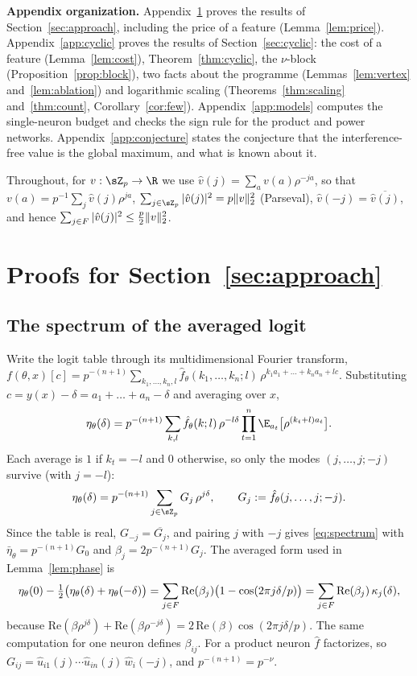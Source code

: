 \textbf{Appendix organization.} Appendix~\ref{app:approach} proves the results of Section~\ref{sec:approach}, including the price of a feature (Lemma~\ref{lem:price}). Appendix~\ref{app:cyclic} proves the results of Section~\ref{sec:cyclic}: the cost of a feature (Lemma~\ref{lem:cost}), Theorem~\ref{thm:cyclic}, the $\nu$-block (Proposition~\ref{prop:block}), two facts about the programme (Lemmas~\ref{lem:vertex} and~\ref{lem:ablation}) and logarithmic scaling (Theorems~\ref{thm:scaling} and~\ref{thm:count}, Corollary~\ref{cor:few}). Appendix~\ref{app:models} computes the single-neuron budget and checks the sign rule for the product and power networks. Appendix~\ref{app:conjecture} states the conjecture that the interference-free value is the global maximum, and what is known about it.

Throughout, for $v:\sZ_p\to\R$ we use $\hat v(j)=\sum_av(a)\rho^{-ja}$, so that $v(a)=p^{-1}\sum_j\hat v(j)\rho^{ja}$, $\sum_{j\in\sZ_p}|\hat v(j)|^2=p\|v\|_2^2$ (Parseval), $\hat v(-j)=\overline{\hat v(j)}$, and hence $\sum_{j\in F}|\hat v(j)|^2\le\frac p2\|v\|_2^2$.

\section{Proofs for Section~\ref{sec:approach}}\label{app:approach}

\subsection{The spectrum of the averaged logit}\label{app:spectrum}

Write the logit table through its multidimensional Fourier transform,
$f(\theta,x)[c]=p^{-(n+1)}\sum_{k_1,\dots,k_n,l}\hat f_\theta(k_1,\dots,k_n;l)\,\rho^{k_1a_1+\dots+k_na_n+lc}$. Substituting $c=y(x)-\delta=a_1+\dots+a_n-\delta$ and averaging over $x$,
\[
\eta_\theta(\delta)=p^{-(n+1)}\sum_{k,l}\hat f_\theta(k;l)\,\rho^{-l\delta}\prod_{t=1}^n\E_{a_t}\big[\rho^{(k_t+l)a_t}\big].
\]
Each average is $1$ if $k_t=-l$ and $0$ otherwise, so only the modes $(j,\dots,j;-j)$ survive (with $j=-l$):
\[
\eta_\theta(\delta)=p^{-(n+1)}\sum_{j\in\sZ_p}G_j\,\rho^{j\delta},\qquad G_j:=\hat f_\theta(j,\dots,j;-j).
\]
Since the table is real, $G_{-j}=\overline{G_j}$, and pairing $j$ with $-j$ gives \eqref{eq:spectrum} with $\bar\eta_\theta=p^{-(n+1)}G_0$ and $\beta_j=2p^{-(n+1)}G_j$. The averaged form used in Lemma~\ref{lem:phase} is
\[
\eta_\theta(0)-\tfrac12\big(\eta_\theta(\delta)+\eta_\theta(-\delta)\big)=\sum_{j\in F}\mathrm{Re}(\beta_j)\big(1-\cos(2\pi j\delta/p)\big)=\sum_{j\in F}\mathrm{Re}(\beta_j)\,\kappa_{j}(\delta),
\]
because $\mathrm{Re}(\beta\rho^{j\delta})+\mathrm{Re}(\beta\rho^{-j\delta})=2\,\mathrm{Re}(\beta)\cos(2\pi j\delta/p)$. The same computation for one neuron defines $\beta_{ij}$. For a product neuron $\hat f$ factorizes, so $G_{ij}=\hat u_{i1}(j)\cdots\hat u_{in}(j)\,\hat w_i(-j)$, and $p^{-(n+1)}=p^{-\nu}$.

